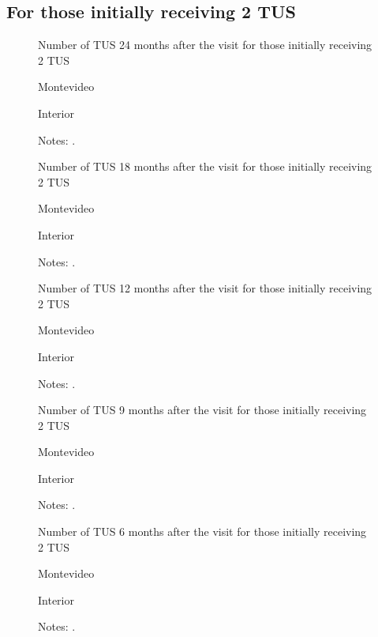 \documentclass[12pt]{article}
\begin{document}
\subsection{For those initially receiving 2 TUS}

\begin{figure}[H]%
	\caption{Number of TUS 24 months after the visit for those initially receiving 2 TUS}%
	\centering
	\caption*{ {Montevideo}}
	\qquad
	\caption*{Interior}
	\label{fig:first_stage_si2Tus_tus24}%
	\caption*{ {\footnotesize Notes: .}}
\end{figure}

\begin{figure}[H]%
	\caption{Number of TUS 18 months after the visit for those initially receiving 2 TUS}%
	\centering
	\caption*{ {Montevideo}}
	\qquad
	\caption*{Interior}
	\label{fig:first_stage_si2Tus_tus18}%
	\caption*{ {\footnotesize Notes: .}}
\end{figure}

\begin{figure}[H]%
	\caption{Number of TUS 12 months after the visit for those initially receiving 2 TUS}%
	\centering
	\caption*{ {Montevideo}}
	\qquad
	\caption*{Interior}
	\label{fig:first_stage_si2Tus_tus12}%
	\caption*{ {\footnotesize Notes: .}}
\end{figure}

\begin{figure}[H]%
	\caption{Number of TUS 9 months after the visit for those initially receiving 2 TUS}%
	\centering
	\caption*{ {Montevideo}}
	\qquad
	\caption*{Interior}
	\label{fig:first_stage_si2Tus_tus9}%
	\caption*{ {\footnotesize Notes: .}}
\end{figure}

\begin{figure}[H]%
	\caption{Number of TUS 6 months after the visit for those initially receiving 2 TUS}%
	\centering
	\caption*{ {Montevideo}}
	\qquad
	\caption*{Interior}
	\label{fig:first_stage_si2Tus_tus6}%
	\caption*{ {\footnotesize Notes: .}}
\end{figure}
\end{document}
